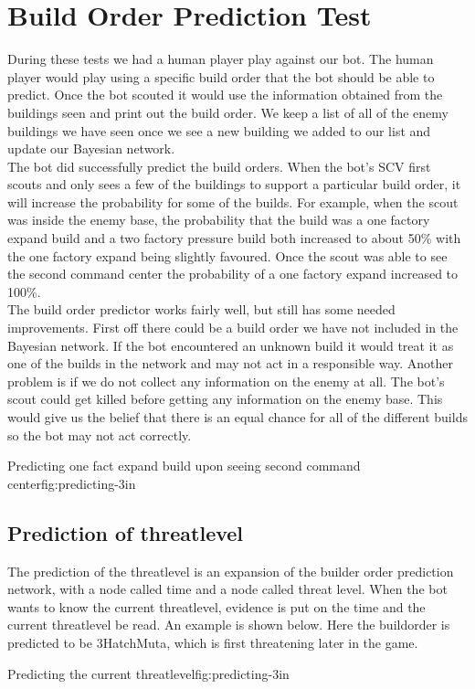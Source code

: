 \section{Build Order Prediction Test}
During these tests we had a human player play against our bot. The human player would play using a specific build order that the bot should be able to predict. Once the bot scouted it would use the information obtained from the buildings seen and print out the build order. We keep a list of all of the enemy buildings we have seen once we see a new building we added to our list and update our Bayesian network.\\
The bot did successfully predict the build orders. When the bot's SCV first scouts and only sees a few of the buildings to support a particular build order, it will increase the probability for some of the builds. For example, when the scout was inside the enemy base, the probability that the build was a one factory expand build and a two factory pressure build both increased to about 50\% with the one factory expand being slightly favoured. Once the scout was able to see the second command center the probability of a one factory expand increased to 100\%. 
\\
The build order predictor works fairly well, but still has some needed improvements. First off there could be a build order we have not included in the Bayesian network. If the bot encountered an unknown build it would treat it as one of the builds in the network and may not act in a responsible way. Another problem is if we do not collect any information on the enemy at all. The bot's scout could get killed before getting any information on the enemy base. This would give us the belief that there is an equal chance for all of the different builds so the bot may not act correctly.


			{Predicting one fact expand build upon seeing second command center}{fig:predicting}{-3in}
	\subsection{Prediction of threatlevel}
		The prediction of the threatlevel is an expansion of the builder order prediction network, with a node called time and a node called threat level. 
		When the bot wants to know the current threatlevel, evidence is put on the time and the current threatlevel be read. An example is shown below. 
		Here the buildorder is predicted to be 3HatchMuta, which is first threatening later in the game. 
	
			{Predicting the current threatlevel}{fig:predicting}{-3in}